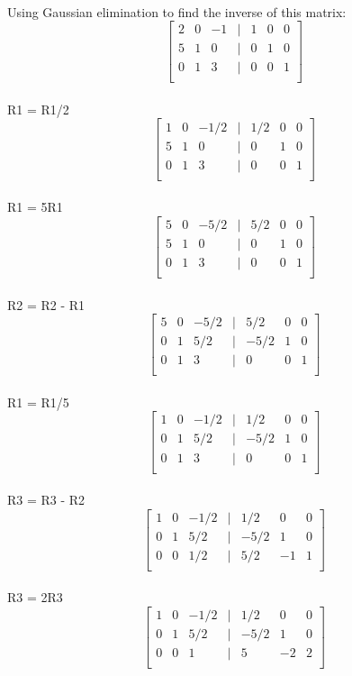 \documentclass[a4paper,12pt]{article} %
\begin{document}
\noindent
\\Using Gaussian elimination to find the inverse of this matrix: \\
\[
\begin{bmatrix}
    2 & 0 & -1 & | & 1 & 0 & 0 \\
    5 & 1 & 0 & | & 0 & 1 & 0 \\
    0 & 1 & 3 & | & 0 & 0 & 1 \\
\end{bmatrix}
\]
\\
R1 = R1/2
\[
\begin{bmatrix}
    1 & 0 & -1/2 & | & 1/2 & 0 & 0 \\
    5 & 1 & 0 & | & 0 & 1 & 0 \\
    0 & 1 & 3 & | & 0 & 0 & 1 \\
\end{bmatrix}
\]
\\
R1 = 5R1
\[
\begin{bmatrix}
    5 & 0 & -5/2 & | & 5/2 & 0 & 0 \\
    5 & 1 & 0 & | & 0 & 1 & 0 \\
    0 & 1 & 3 & | & 0 & 0 & 1 \\
\end{bmatrix}
\]
\\
R2 = R2 - R1
\[
\begin{bmatrix}
    5 & 0 & -5/2 & | & 5/2 & 0 & 0 \\
    0 & 1 & 5/2 & | & -5/2 & 1 & 0 \\
    0 & 1 & 3 & | & 0 & 0 & 1 \\
\end{bmatrix}
\]
\\
R1 = R1/5
\[
\begin{bmatrix}
    1 & 0 & -1/2 & | & 1/2 & 0 & 0 \\
    0 & 1 & 5/2 & | & -5/2 & 1 & 0 \\
    0 & 1 & 3 & | & 0 & 0 & 1 \\
\end{bmatrix}
\]
\\
R3 = R3 - R2
\[
\begin{bmatrix}
    1 & 0 & -1/2 & | & 1/2 & 0 & 0 \\
    0 & 1 & 5/2 & | & -5/2 & 1 & 0 \\
    0 & 0 & 1/2 & | & 5/2 & -1 & 1 \\
\end{bmatrix}
\]
\\
R3 = 2R3
\[
\begin{bmatrix}
    1 & 0 & -1/2 & | & 1/2 & 0 & 0 \\
    0 & 1 & 5/2 & | & -5/2 & 1 & 0 \\
    0 & 0 & 1 & | & 5 & -2 & 2 \\
\end{bmatrix}
\]
\end{document}
